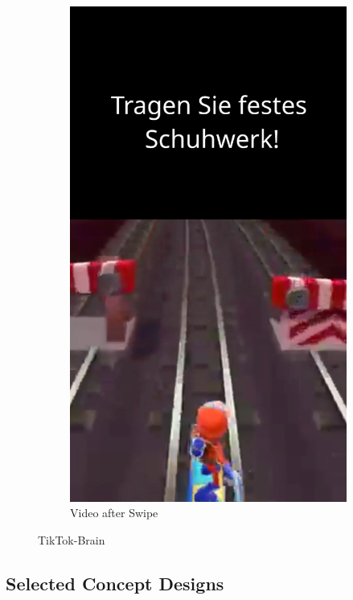 \documentclass{article}
\begin{document}
\begin{figure}[H]
\begin{subfigure}[t]{0.45\textwidth}
        \includegraphics[width=\textwidth]{./resources/StairTikTokBrain_2.png}
        \caption{Video after Swipe}
    \end{subfigure}
    \caption{TikTok-Brain}
    \label{fig:StairTikTokBrain}
\end{figure}


\subsection{Selected Concept Designs}
\end{document}
